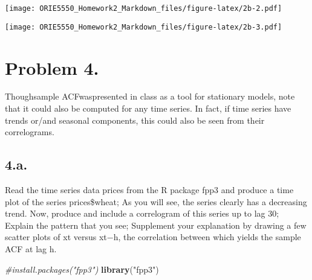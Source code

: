 \documentclass[
]{article}
\newenvironment{Shaded}{\begin{snugshade}}{\end{snugshade}}
\newcommand{\AttributeTok}[1]{\textcolor[rgb]{0.13,0.29,0.53}{#1}}
\newcommand{\CommentTok}[1]{\textcolor[rgb]{0.56,0.35,0.01}{\textit{#1}}}
\newcommand{\DecValTok}[1]{\textcolor[rgb]{0.00,0.00,0.81}{#1}}
\newcommand{\FunctionTok}[1]{\textcolor[rgb]{0.13,0.29,0.53}{\textbf{#1}}}
\newcommand{\NormalTok}[1]{#1}
\newcommand{\SpecialCharTok}[1]{\textcolor[rgb]{0.81,0.36,0.00}{\textbf{#1}}}
\newcommand{\StringTok}[1]{\textcolor[rgb]{0.31,0.60,0.02}{#1}}
\begin{document}
\texttt{[image: ORIE5550\_Homework2\_Markdown\_files/figure-latex/2b-2.pdf]}

\begin{Shaded}
\end{Shaded}

\texttt{[image: ORIE5550\_Homework2\_Markdown\_files/figure-latex/2b-3.pdf]}

\hypertarget{problem-4.}{%
\section{Problem 4.}\label{problem-4.}}

Thoughsample ACFwaspresented in class as a tool for stationary models,
note that it could also be computed for any time series. In fact, if
time series have trends or/and seasonal components, this could also be
seen from their correlograms.

\hypertarget{a.-1}{%
\subsection{4.a.}\label{a.-1}}

Read the time series data prices from the R package fpp3 and produce a
time plot of the series prices\$wheat; As you will see, the series
clearly has a decreasing trend. Now, produce and include a correlogram
of this series up to lag 30; Explain the pattern that you see;
Supplement your explanation by drawing a few scatter plots of xt versus
xt−h, the correlation between which yields the sample ACF at lag h.

\begin{Shaded}
\begin{Highlighting}[]
\CommentTok{\#install.packages("fpp3")}
\FunctionTok{library}\NormalTok{(}\StringTok{"fpp3"}\NormalTok{)}
\end{Highlighting}
\end{Shaded}
\end{document}
